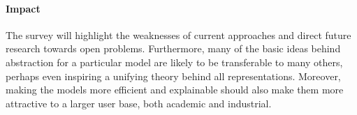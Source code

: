 \documentclass{article}
\begin{document}
\paragraph{Impact}

The survey will highlight the weaknesses of current approaches and direct future
research towards open problems. Furthermore, many of the basic ideas behind
abstraction for a particular model are likely to be transferable to many others,
perhaps even inspiring a unifying theory behind all representations. Moreover,
making the models more efficient and explainable should also make them more
attractive to a larger user base, both academic and industrial.



\end{document}
